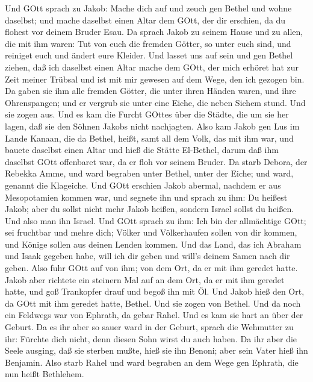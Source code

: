  Und GOtt sprach zu Jakob: Mache dich auf und zeuch gen
Bethel und wohne daselbst; und mache daselbst einen Altar dem GOtt, der
dir erschien, da du flohest vor deinem Bruder Esau.  Da
sprach Jakob zu seinem Hause und zu allen, die mit ihm waren: Tut von
euch die fremden Götter, so unter euch sind, und reiniget euch und
ändert eure Kleider.  Und lasset uns auf sein und gen Bethel
ziehen, daß ich daselbst einen Altar mache dem GOtt, der mich erhöret
hat zur Zeit meiner Trübsal und ist mit mir gewesen auf dem Wege, den
ich gezogen bin.  Da gaben sie ihm alle fremden Götter, die
unter ihren Händen waren, und ihre Ohrenspangen; und er vergrub sie
unter eine Eiche, die neben Sichem stund.  Und sie zogen
aus. Und es kam die Furcht GOttes über die Städte, die um sie her lagen,
daß sie den Söhnen Jakobs nicht nachjagten.  Also kam Jakob
gen Lus im Lande Kanaan, die da Bethel, heißt, samt all dem Volk, das
mit ihm war,  und bauete daselbst einen Altar und hieß die
Stätte El-Bethel, darum daß ihm daselbst GOtt offenbaret war, da er floh
vor seinem Bruder.  Da starb Debora, der Rebekka Amme, und
ward begraben unter Bethel, unter der Eiche; und ward, genannt die
Klageiche.  Und GOtt erschien Jakob abermal, nachdem er aus
Mesopotamien kommen war, und segnete ihn  und sprach zu
ihm: Du heißest Jakob; aber du sollst nicht mehr Jakob heißen, sondern
Israel sollst du heißen. Und also man ihn Israel.  Und GOtt
sprach zu ihm: Ich bin der allmächtige GOtt; sei fruchtbar und mehre
dich; Völker und Völkerhaufen sollen von dir kommen, und Könige sollen
aus deinen Lenden kommen.  Und das Land, das ich Abraham
und Isaak gegeben habe, will ich dir geben und will's deinem Samen nach
dir geben.  Also fuhr GOtt auf von ihm; von dem Ort, da er
mit ihm geredet hatte.  Jakob aber richtete ein steinern
Mal auf an dem Ort, da er mit ihm geredet hatte, und goß Trankopfer
drauf und begoß ihn mit Öl.  Und Jakob hieß den Ort, da
GOtt mit ihm geredet hatte, Bethel.  Und sie zogen von
Bethel. Und da noch ein Feldwegs war von Ephrath, da gebar Rahel.
 Und es kam sie hart an über der Geburt. Da es ihr aber so
sauer ward in der Geburt, sprach die Wehmutter zu ihr: Fürchte dich
nicht, denn diesen Sohn wirst du auch haben.  Da ihr aber
die Seele ausging, daß sie sterben mußte, hieß sie ihn Benoni; aber sein
Vater hieß ihn Benjamin.  Also starb Rahel und ward
begraben an dem Wege gen Ephrath, die nun heißt Bethlehem. 
